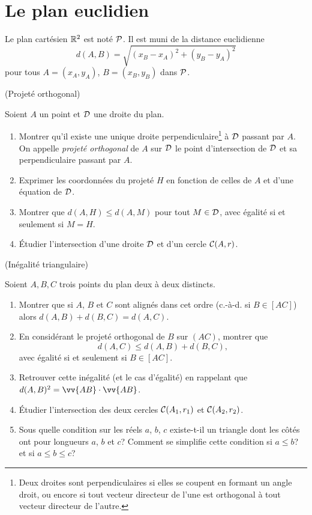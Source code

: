 \documentclass[a4paper,11pt,reqno]{amsart}
\begin{document}

\section{Le plan euclidien}

\begin{convention}
  Le plan cartésien $\mathbb{R}^2$ est noté $\mathcal{P}$. Il est muni de la distance euclidienne
  \[
    d(A,B)=\sqrt{(x_B-x_A)^2+(y_B-y_A)^2}
  \]
  pour tous $A=(x_A,y_A)$, $B=(x_B,y_B)$ dans $\mathcal{P}$.
\end{convention}


\begin{exo} (Projeté orthogonal)

  Soient $A$ un point et $\mathcal{D}$ une droite du plan.
  \begin{enumerate}
     \item Montrer qu'il existe une unique droite perpendiculaire\footnote{Deux droites sont perpendiculaires si elles se coupent en formant un angle droit, ou encore si tout vecteur directeur de l'une est orthogonal à tout vecteur directeur de l'autre.} à $\mathcal{D}$ passant par $A$. On appelle \emph{projeté orthogonal} de $A$ sur $\mathcal{D}$ le point d'intersection de $\mathcal{D}$ et sa perpendiculaire passant par $A$.
     \item Exprimer les coordonnées du projeté $H$ en fonction de celles de $A$ et d'une équation de $\mathcal{D}$.
     \item Montrer que $d(A,H)\leqslant d(A,M)$ pour tout $M \in \mathcal{D}$, avec égalité si et seulement si $M=H$.
     \item Étudier l'intersection d'une droite $\mathcal{D}$ et d'un cercle $\mathcal{C}(A,r)$.
  \end{enumerate}
\end{exo}


\begin{exo} (Inégalité triangulaire)

  Soient $A,B,C$ trois points du plan deux à deux distincts.
  \begin{enumerate}
    \item Montrer que si $A$, $B$ et $C$ sont alignés dans cet ordre (c.-à-d. si $B \in [AC]$) alors $d(A,B)+d(B,C)=d(A,C)$.
    \item En considérant le projeté orthogonal de $B$ sur $(AC)$, montrer que
    \[
      d(A,C) \leqslant d(A,B)+d(B,C),
    \]
    avec égalité si et seulement si $B \in [AC]$.
    \item Retrouver cette inégalité (et le cas d'égalité) en rappelant que $d(A,B)^{2}=\vv{AB}\cdot\vv{AB}$.
    \item Étudier l'intersection des deux cercles $\mathcal{C}(A_1,r_1)$ et $\mathcal{C}(A_2,r_2)$.
    \item Sous quelle condition sur les réels $a$, $b$, $c$ existe-t-il un triangle dont les côtés ont pour longueurs $a$, $b$ et $c$? Comment se simplifie cette condition si $a \leqslant b$? et si $a \leqslant b \leqslant c$?
  \end{enumerate}
\end{exo}
\end{document}
